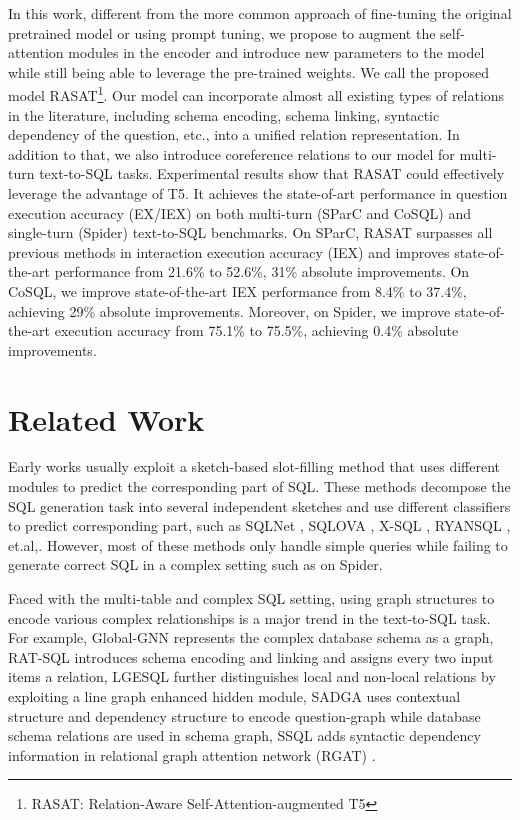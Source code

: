 \documentclass[11pt]{article}
\begin{document}
In this work, different from the more common approach of fine-tuning the original pretrained model or using prompt tuning, we propose to augment the self-attention modules in the encoder and introduce new parameters to the model while still being able to leverage the pre-trained weights. We call the proposed model RASAT\footnote{RASAT: Relation-Aware Self-Attention-augmented T5}.
Our model can incorporate almost all existing types of relations in the literature, including schema encoding, schema linking, syntactic dependency of the question, etc., into a unified relation representation. In addition to that, we also introduce coreference relations to our model for multi-turn text-to-SQL tasks. Experimental results show that RASAT could effectively leverage the advantage of T5. It achieves the state-of-art performance in question execution accuracy (EX/IEX) on both multi-turn (SParC and CoSQL) and single-turn (Spider) text-to-SQL benchmarks.
On SParC, RASAT surpasses all previous methods in interaction execution accuracy (IEX) and improves state-of-the-art performance from 21.6\% to 52.6\%, 31\% absolute improvements. On CoSQL, we improve state-of-the-art IEX performance from 8.4\% to 37.4\%, achieving 29\% absolute improvements. 
Moreover, on Spider, we improve state-of-the-art execution accuracy from 75.1\% to 75.5\%, achieving 0.4\% absolute improvements. 


\section{Related Work}
Early works usually exploit a sketch-based slot-filling method that uses different modules to predict the corresponding part of SQL. These methods decompose the SQL generation task into several independent sketches and use different classifiers to predict corresponding part, such as SQLNet \citep{xu2017sqlnet}, SQLOVA \citep{hwang2019comprehensive}, X-SQL \citep{he2019x}, RYANSQL \citep{choi-etal-2021-ryansql}, et.al,.
However, most of these methods only handle simple queries while failing to generate correct SQL in a complex setting such as on Spider. 

Faced with the multi-table and complex SQL setting, using graph structures to encode various complex relationships is a major trend in the text-to-SQL task. 
For example, Global-GNN \citep{bogin-etal-2019-global} represents the complex database schema as a graph,
RAT-SQL \citep{wang-etal-2020-rat} introduces schema encoding and linking and assigns every two input items a relation, LGESQL \citep{cao-etal-2021-lgesql} further distinguishes local and non-local relations by exploiting a line graph enhanced hidden module, SADGA \citep{NEURIPS2021_3f1656d9} uses contextual structure and dependency structure to encode question-graph while database schema relations are used in schema graph, SSQL \citep{hui2022s} adds syntactic dependency information in relational graph attention network (RGAT) \citep{wang-etal-2020-relational}.
\end{document}
